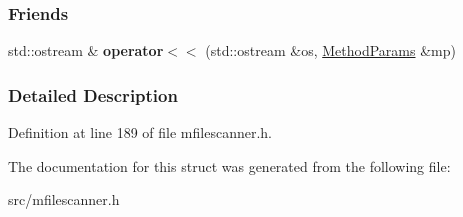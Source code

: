 \subsubsection*{Friends}
\begin{DoxyCompactItemize}
\item 
\hypertarget{struct_method_params_aa0e6c0e99138939dbaca5217fd35561a}{}std\+::ostream \& {\bfseries operator$<$$<$} (std\+::ostream \&os, \hyperlink{struct_method_params}{Method\+Params} \&mp)\label{struct_method_params_aa0e6c0e99138939dbaca5217fd35561a}

\end{DoxyCompactItemize}


\subsubsection{Detailed Description}


Definition at line 189 of file mfilescanner.\+h.



The documentation for this struct was generated from the following file\+:\begin{DoxyCompactItemize}
\item 
src/mfilescanner.\+h\end{DoxyCompactItemize}
